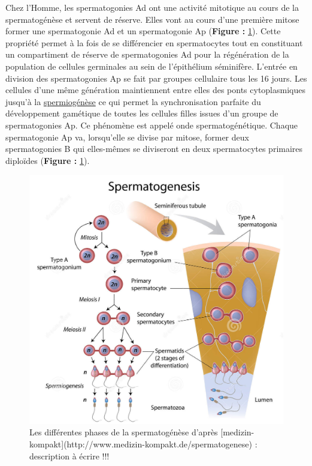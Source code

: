 \documentclass[12pt,twoside]{reedthesis}
\theoremstyle{definition}
\theoremstyle{definition}
\theoremstyle{remark}
\begin{document}
  Chez l'Homme, les spermatogonies Ad ont une activité mitotique au cours
  de la spermatogénèse et servent de réserve. Elles vont au cours d'une
  première mitose former une spermatogonie Ad et un spermatogonie Ap
  (\textbf{Figure :} \ref{fig:spermatogenese}). Cette propriété permet à
  la fois de se différencier en spermatocytes tout en constituant un
  compartiment de réserve de spermatogonies Ad pour la régénération de la
  population de cellules germinales au sein de l'épithélium séminifère.
  L'entrée en division des spermatogonies Ap se fait par groupes
  cellulaire tous les 16 jours. Les cellules d'une même génération
  maintiennent entre elles des ponts cytoplasmiques jusqu'à la
  \protect\hyperlink{spermiogenese}{spermiogénèse} ce qui permet la
  synchronisation parfaite du développement gamétique de toutes les
  cellules filles issues d'un groupe de spermatogonies Ap. Ce phénomène
  est appelé onde spermatogénétique. Chaque spermatogonie Ap va,
  lorsqu'elle se divise par mitose, former deux spermatogonies B qui
  elles-mêmes se diviseront en deux spermatocytes primaires diploïdes
  (\textbf{Figure :} \ref{fig:spermatogenese}).
  
  \newpage
  
  \begin{figure}
  
  {\centering \includegraphics[scale=0.35]{figure/spermatogenese2} 
  
  }
  
  \caption{Les différentes phases de la spermatogénèse d'après [medizin-kompakt](http://www.medizin-kompakt.de/spermatogenese) : description à écrire !!!}\label{fig:spermatogenese}
  \end{figure}
  
\end{document}
